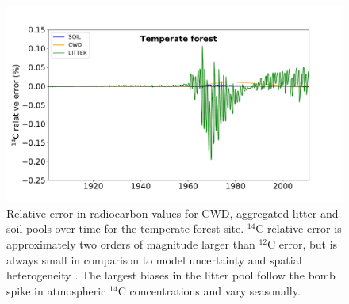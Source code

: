\documentclass[draft]{agujournal2019}
\begin{document}
\begin{figure}[htbp]
        \centering 
        \includegraphics[width=1.0\linewidth]{figs/C14_through_time_rel_err_10.pdf}
        \caption{Relative error in radiocarbon values for CWD, aggregated litter and soil pools over time for the temperate forest site. $^{14}$C relative error is approximately two orders of magnitude larger than $^{12}$C error, but is always small in comparison to model uncertainty and spatial heterogeneity \cite{Chen2009JGR, Lawrence2019}. The largest biases in the litter pool follow the bomb spike in atmospheric $^{14}$C concentrations and vary seasonally.}
        \label{fig:10dayErrorOverTime}
\end{figure}    
\end{document}
